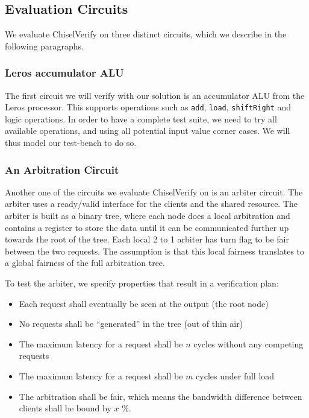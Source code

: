 \documentclass[conference]{IEEEtran}
\begin{document}
\subsection{Evaluation Circuits}
We evaluate ChiselVerify on three distinct circuits, which we describe in the following paragraphs.

\subsubsection{Leros accumulator ALU}

The first circuit we will verify with our solution is an accumulator ALU from the Leros processor.
This supports operations such as \texttt{add}, \texttt{load}, \texttt{shiftRight} and logic operations. 
In order to have a complete test suite, we need to try all available operations, and using all potential input value corner cases.
We will thus model our test-bench to do so.

\subsubsection{An Arbitration Circuit}

Another one of the circuits we evaluate ChiselVerify on is an arbiter circuit.
The arbiter uses a ready/valid interface for the clients and the shared resource. 
The arbiter is built as a binary tree, where each node does a local arbitration
and contains a register to store the data until it can be communicated further up towards the root of the
tree. Each local 2 to 1 arbiter has turn flag to be fair between the two requests. The assumption is that
this local fairness translates to a global fairness of the full arbitration tree.

To test the arbiter, we specify properties that result in a verification plan:

\begin{itemize}
\item Each request shall eventually be seen at the output (the root node)
\item No requests shall be ``generated'' in the tree (out of thin air)
\item The maximum latency for a request shall be $n$ cycles without any competing requests
\item The maximum latency for a request shall be $m$ cycles under full load
\item The arbitration shall be fair, which means the bandwidth difference between clients shall be bound by $x$ \%.
\end{itemize}
\end{document}
